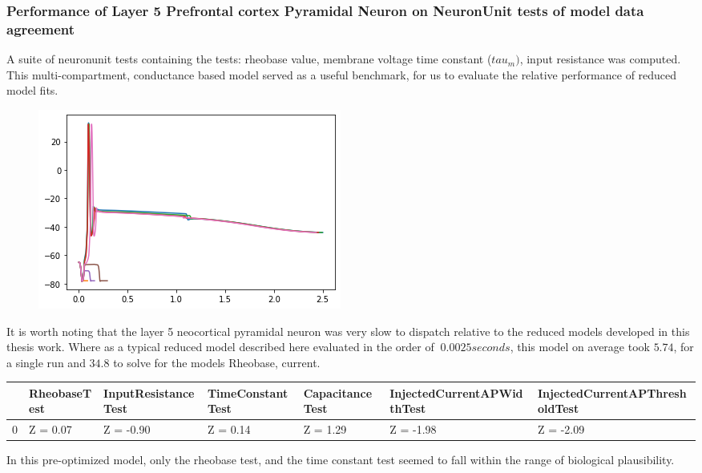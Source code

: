 \subsubsection{Performance of Layer 5 Prefrontal cortex Pyramidal Neuron on NeuronUnit tests of model data agreement}

A suite of neuronunit tests containing the tests: rheobase value, membrane voltage time constant ($tau_{m})$, input resistance was computed. This multi-compartment, conductance based model served as a useful benchmark, for us to evaluate the relative performance of reduced model fits.
    
\begin{figure}    
\begin{center}
    \includegraphics[width=0.7\linewidth]{figures/NU_BBP_fusion_L5PC_files/NU_BBP_fusion_L5PC_3_1.png}
\end{center}
\end{figure}  

It is worth noting that the layer 5 neocortical pyramidal neuron was very slow to dispatch relative to the reduced models developed in this thesis work. Where as a typical reduced model described here evaluated in the order of $~0.0025 seconds$, this model on average took $5.74$, for a single run and $34.8$ to solve for the models Rheobase, current.

\begin{table}
\begin{tabular}{lllllll}
\toprule
{} & RheobaseTest & InputResistanceTest & TimeConstantTest & CapacitanceTest & InjectedCurrentAPWidthTest & InjectedCurrentAPThresholdTest \\
\midrule
0 &     Z = 0.07 &           Z = -0.90 &         Z = 0.14 &        Z = 1.29 &                  Z = -1.98 &                      Z = -2.09 \\
\bottomrule
\end{tabular}
\end{table}

In this pre-optimized model, only the rheobase test, and the time constant test seemed to fall within the range of biological plausibility.